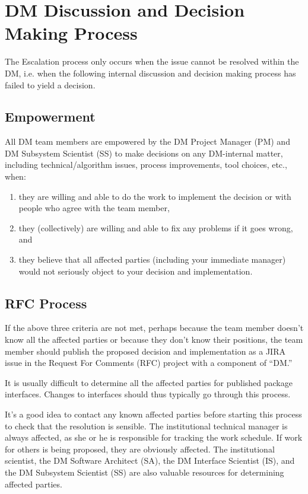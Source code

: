 \section{DM Discussion and Decision Making Process}
\label{sect:ddmp}

The Escalation process only occurs when the issue cannot be resolved within the DM, i.e. when the following internal discussion and decision making process has failed to yield a decision.
\subsection{Empowerment}
All DM team members are empowered by the DM Project Manager (PM) and DM Subsystem  Scientist (SS) to make decisions on any DM-internal matter, including technical/algorithm issues, process improvements, tool choices, etc., when:
\begin{enumerate}
\item they are willing and able to do the work to implement the decision or with people who agree with the team member,
\item they (collectively) are willing and able to fix any problems if it goes wrong, and
\item they believe that all affected parties (including your immediate manager) would not seriously object to your decision and implementation.
\end{enumerate}

\subsection{RFC Process}
If the above three criteria are not met, perhaps because the team member doesn't know all the affected parties or because they don't know their positions, the team member should publish the proposed decision and implementation as a JIRA issue in the Request For Comments (RFC) project with a component of ``DM.''

It is usually difficult to determine all the affected parties for published package interfaces. Changes to interfaces should thus typically go through this process.

It's a good idea to contact any known affected parties before starting this process to check that the resolution is sensible. The institutional technical manager is always affected, as she or he is responsible for tracking the work schedule. If work for others is being proposed, they are obviously affected. The institutional scientist, the DM Software Architect (SA), the DM Interface Scientist (IS), and the DM Subsystem  Scientist (SS) are also valuable resources for determining affected parties.


